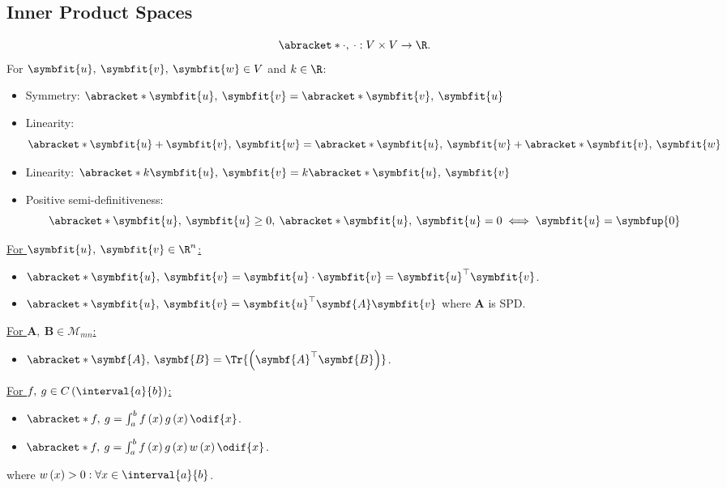 \documentclass{article}
\begin{document}
\begin{multicols*}{3}
    \subsection{Inner Product Spaces}
    \begin{equation*}
        \abracket*{\cdot,\: \cdot} : V \times V \to \R.
    \end{equation*}
    For \(\symbfit{u},\: \symbfit{v},\: \symbfit{w} \in V\)
    and \(k \in \R\):
    \begin{itemize}
        \item Symmetry: \(\abracket*{\symbfit{u},\: \symbfit{v}} = \abracket*{\symbfit{v},\: \symbfit{u}}\)
        \item Linearity:
              \begin{equation*}
                  \abracket*{\symbfit{u} + \symbfit{v},\: \symbfit{w}} = \abracket*{\symbfit{u},\: \symbfit{w}} + \abracket*{\symbfit{v},\: \symbfit{w}}
              \end{equation*}
        \item Linearity: \(\abracket*{k \symbfit{u},\: \symbfit{v}} = k\abracket*{\symbfit{u},\: \symbfit{v}}\)
        \item Positive semi-definitiveness:
              \begin{equation*}
                  \abracket*{\symbfit{u},\: \symbfit{u}} \geq 0,\: \abracket*{\symbfit{u},\: \symbfit{u}} = 0 \iff \symbfit{u} = \symbfup{0}
              \end{equation*}
    \end{itemize}
    \underline{For \(\symbfit{u},\: \symbfit{v} \in \R^n\):}
    \begin{itemize}
        \item \(\abracket*{\symbfit{u},\: \symbfit{v}} = \symbfit{u} \cdot \symbfit{v} = \symbfit{u}^\top \symbfit{v}\).
        \item \(\abracket*{\symbfit{u},\: \symbfit{v}} = \symbfit{u}^\top \symbf{A} \symbfit{v}\) where \(\symbf{A}\) is SPD\@.
    \end{itemize}
    \underline{For \(\symbf{A},\: \symbf{B} \in \mathscr{M}_{mn}\):}
    \begin{itemize}
        \item \(\abracket*{\symbf{A},\: \symbf{B}} = \Tr{\left( \symbf{A}^\top \symbf{B} \right)}\).
    \end{itemize}
    \underline{For \(f,\: g \in C\left( \interval{a}{b} \right)\):}
    \begin{itemize}
        \item \(\abracket*{f,\: g} = \int_a^b f\left( x \right) g\left( x \right) \odif{x}\).
        \item \(\abracket*{f,\: g} = \int_a^b f\left( x \right) g\left( x \right) w\left( x \right) \odif{x}\).
    \end{itemize}
    where \(w\left( x \right) > 0 : \forall x \in \interval{a}{b}\).

\end{multicols*}
\end{document}
